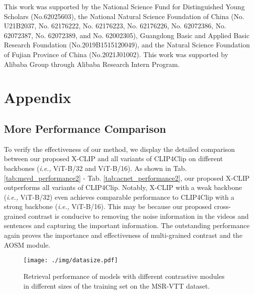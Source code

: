 \documentclass[sigconf]{acmart}
\begin{document}
\begin{acks}
This work was supported by the National Science Fund for Distinguished Young Scholars (No.62025603), the National Natural Science Foundation of China (No. U21B2037, No. 62176222, No. 62176223, No. 62176226, No. 62072386, No. 62072387, No. 62072389, and No. 62002305), Guangdong Basic and Applied Basic Research Foundation (No.2019B1515120049), and the Natural Science Foundation of Fujian Province of China (No.2021J01002). This work was supported by Alibaba Group through Alibaba Research Intern Program.
\end{acks}





\balance


\newpage



\section{Appendix}


\subsection{More Performance Comparison}

To verify the effectiveness of our method, we display the detailed comparison between our proposed X-CLIP and all variants of CLIP4Clip on different backbones (\emph{i.e.,} ViT-B/32 and ViT-B/16). As shown in  Tab. \ref{tab:msvd_performance2} - Tab. \ref{tab:acnet_performance2}, our proposed X-CLIP outperforms all variants of CLIP4Clip. Notably, X-CLIP with a weak backbone (\emph{i.e.,} ViT-B/32) even achieves comparable performance to CLIP4Clip with a strong backbone (\emph{i.e.,} ViT-B/16). This may be because our proposed cross-grained contrast is conducive to removing the noise information in the videos and sentences and capturing the important information. The outstanding performance again proves the importance and effectiveness of multi-grained contrast and the AOSM module. 



\begin{figure}
\centering 
  \texttt{[image: ./img/datasize.pdf]}
  \caption{Retrieval performance of models with different contrastive modules in different sizes of the training set on the MSR-VTT dataset. }
  \label{fig:datasize}
\end{figure}
\end{document}
